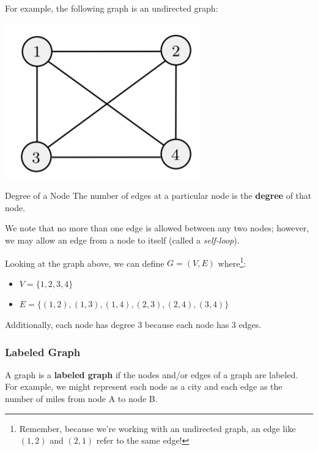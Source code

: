 \documentclass[letterpaper]{article}
\begin{document}
\bigskip

For example, the following graph is an undirected graph:
\begin{center}
    \includegraphics[scale=0.7]{../assets/rectangle_graph.png}
\end{center}

\begin{definition}{Degree of a Node}{}
    The number of edges at a particular node is the \textbf{degree} of that node. 
\end{definition}
We note that no more than one edge is allowed between any two nodes; however, we may allow an edge from a node to itself (called a \emph{self-loop}). 

\bigskip

Looking at the graph above, we can define $G = (V, E)$ where\footnote{Remember, because we're working with an undirected graph, an edge like $(1, 2)$ and $(2, 1)$ refer to the same edge!}:
\begin{itemize}
    \item $V = \{1, 2, 3, 4\}$
    \item $E = \{(1, 2), (1, 3), (1, 4), (2, 3), (2, 4), (3, 4)\}$
\end{itemize}
Additionally, each node has degree 3 because each node has 3 edges.  

\subsubsection{Labeled Graph}
A graph is a \textbf{labeled graph} if the nodes and/or edges of a graph are labeled. For example, we might represent each node as a city and each edge as the number of miles from node A to node B. 
\end{document}
